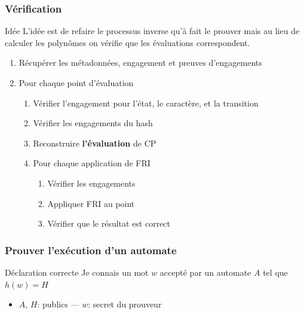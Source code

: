 \documentclass{beamer}
\begin{document}
\begin{frame}
\frametitle{Vérification}
\begin{block}{Idée}
L'idée est de refaire le processus inverse qu'à fait le prouver mais au lieu de calculer les polynômes on vérifie que les évaluations correspondent.
\end{block}
\begin{enumerate}
    \item Récupérer les métadonnées, engagement et preuves d'engagements
    \item Pour chaque point d'évaluation
    \begin{enumerate}
        \item Vérifier l'engagement pour l'état, le caractère, et la transition
        \item Vérifier les engagements du hash
        \item Reconstruire \textbf{l'évaluation} de CP
        \item Pour chaque application de FRI
        \begin{enumerate}
            \item Vérifier les engagements
            \item Appliquer FRI au point
            \item Vérifier que le résultat est correct
        \end{enumerate}
    \end{enumerate}
\end{enumerate}
\end{frame}

\begin{frame}
\frametitle{Prouver l'exécution d'un automate}

\begin{block}{Déclaration correcte}
Je connais un mot $w$ accepté par un automate $A$ tel que $h(w) = H$
\end{block}

\begin{itemize}
    \item $A$, $H$: publics — $w$: secret du prouveur
\end{itemize}

\end{frame}
\end{document}
